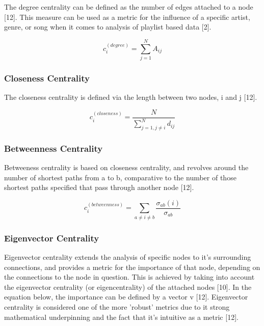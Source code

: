 \documentclass[conference]{IEEEtran}
\begin{document}
The degree centrality can be defined as the number of edges attached to a node [12]. This measure can be used as a metric for the influence of a specific artist, genre, or song when it comes to analysis of playlist based data [2].

\begin{equation}
\label{}
c_i^{(degree)} = \sum_{j=1}^{N}A_{ij}
\end{equation}

\subsubsection{Closeness Centrality}

The closeness centrality is defined via the length between two nodes, i and j [12].

\begin{equation}
\label{}
c_i^{(closeness)} = \frac{N}{\sum_{j=1, j \neq i}^{N}d_{ij}}
\end{equation}

\subsubsection{Betweenness Centrality}

Betweeness centrality is based on closeness centrality, and revolves around the number of shortest paths from a to b, comparative to the number of those shortest paths specified that pass through another node [12].

\begin{equation}
\label{}
c_i^{(betweenness)} = \sum_{a \neq i \neq b}  \frac{\sigma_{ab}(i)}{\sigma_{ab}}
\end{equation}

\subsubsection{Eigenvector Centrality}

Eigenvector centrality extends the analysis of specific nodes to it's surrounding connections, and provides a metric for the importance of that node, depending on the connections to the node in question. This is achieved by taking into account the eigenvector centrality (or eigencentrality) of the attached nodes [10]. In the equation below, the importance can be defined by a vector v [12]. Eigenvector centrality is considered one of the more 'robust' metrics due to it strong mathematical underpinning and the fact that it's intuitive as a metric [12].
\end{document}
